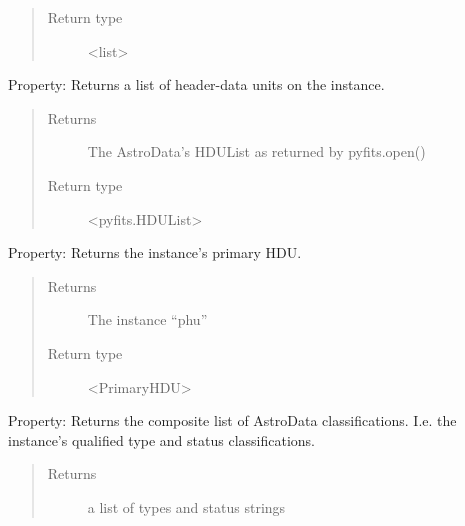 \documentclass[letterpaper,10pt,english]{sphinxmanual}
\begin{document}
\begin{fulllineitems}
\begin{fulllineitems}
\begin{quote}
\begin{description}
\item[{Return type}] \leavevmode
\textless{}list\textgreater{}

\end{description}\end{quote}

\end{fulllineitems}


\begin{fulllineitems}
\label{astro_class:astrodata.AstroData.hdulist}
Property: Returns a list of header-data units on the instance.
\begin{quote}\begin{description}
\item[{Returns}] \leavevmode
The AstroData's HDUList as returned by pyfits.open()

\item[{Return type}] \leavevmode
\textless{}pyfits.HDUList\textgreater{}

\end{description}\end{quote}

\end{fulllineitems}


\begin{fulllineitems}
\label{astro_class:astrodata.AstroData.phu}
Property: Returns the instance's primary HDU.
\begin{quote}\begin{description}
\item[{Returns}] \leavevmode
The instance ``phu''

\item[{Return type}] \leavevmode
\textless{}PrimaryHDU\textgreater{}

\end{description}\end{quote}

\end{fulllineitems}


\begin{fulllineitems}
\label{astro_class:astrodata.AstroData.types}
Property: Returns the composite list of AstroData classifications. I.e. 
the instance's qualified type and status classifications.
\begin{quote}\begin{description}
\item[{Returns}] \leavevmode
a list of types and status strings


\end{description}
\end{quote}
\end{fulllineitems}
\end{fulllineitems}
\end{document}
